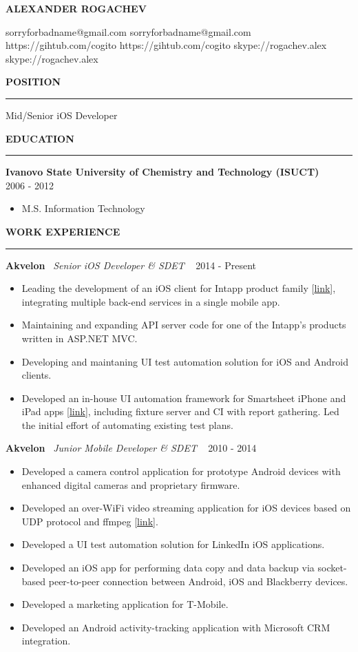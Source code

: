 ﻿\documentclass{article}
\newcommand*{\applicant}[1]{\gdef\applicanttext{#1}}
\newcommand*{\github}[1]{\gdef\githubtext{#1}}
\newcommand*{\email}[1]{\gdef\emailtext{#1}}
\newcommand*{\skype}[1]{\gdef\skypetext{#1}}
\renewcommand\maketitle{
  {\setstretch{1.2}
    \centerline{
       \textbf{\huge{\expandafter\MakeUppercase\expandafter{\applicanttext}}}
    }
    \begin{center}
      \ifdefined\emailtext
        \faEnvelopeO \hspace{0.1cm} \emailtext \hspace{0.1cm}
      \fi
      \ifdefined\githubtext
        \faGithub \hspace{0.1cm} \githubtext \hspace{0.1cm}
      \fi
      \ifdefined\skypetext
        \faSkype \hspace{0.1cm} \skypetext \hspace{0.1cm}

      \fi
      \ifdefined\linkedintext
        \faLinkedin \hspace{0.1cm} \linkedintext

      \fi
    \end{center}
  }
}
\newcommand{\cvsection}[1]{
  \vspace{2.6ex}
  \noindent\textbf{\large{\uppercase{#1}}}
  \vspace{1ex}
  \hrule
  \vspace{1.5ex}
}
\newcommand{\cvparagraph}[3]{
  \noindent\indent
  \textbf{#1}
  \ 
  \textit{#2}
  \ 
  \hfill{}
  {#3}\vspace{1ex}}
\newcommand{\cvlist}[1]{
  \begin{itemize}[topsep=0ex,leftmargin=*,itemsep=0ex,parsep=1ex,labelwidth=\parindent]
    #1
  \end{itemize}
}
\begin{document}
\pagestyle{fancy}
\fancyhf{}
\renewcommand{\headrulewidth}{0pt}
\cfoot{ \the\year\ --\ \LaTeX }

\applicant{Alexander Rogachev}
\github{https://gihtub.com/cogito}
\email{sorryforbadname@gmail.com}
\skype{skype://rogachev.alex}

\maketitle

\cvsection{Position}
Mid/Senior iOS Developer

\cvsection{Education}
\cvparagraph{Ivanovo State University of Chemistry and Technology (ISUCT)}{}{2006 - 2012}
\begin{itemize}[topsep=0ex,leftmargin=*]
  \item M.S. Information Technology
\end{itemize}

\cvsection{Work Experience}

\cvparagraph{Akvelon}{Senior iOS Developer \& SDET}{2014 - Present}
\cvlist{
  \item Leading the development of an iOS client for Intapp product family [\href{https://itunes.apple.com/us/app/intapp/id1052877767}{link}], integrating multiple back-end services in a single mobile app.
  \item Maintaining and expanding API server code for one of the Intapp's products written in ASP.NET MVC.
  \item Developing and maintaning UI test automation solution for iOS and Android clients.
  \item Developed an in-house UI automation framework for Smartsheet iPhone and iPad apps [\href{https://itunes.apple.com/us/app/smartsheet/id568421135}{link}], including fixture server and CI with report gathering. Led the initial effort of automating existing test plans.
}
\vspace{1ex}

\cvparagraph{Akvelon}{Junior Mobile Developer \& SDET}{2010 - 2014}
\cvlist{
  \item Developed a camera control application for prototype Android devices with enhanced digital cameras and proprietary firmware.
  \item Developed an over-WiFi video streaming application for iOS devices based on UDP protocol and ffmpeg [\href{http://neuronbeta.com/chirpglobal/chirpvision/app/}{link}].
  \item Developed a UI test automation solution for LinkedIn iOS applications.
  \item Developed an iOS app for performing data copy and data backup via socket-based peer-to-peer connection between Android, iOS and Blackberry devices.
  \item Developed a marketing application for T-Mobile.
  \item Developed an Android activity-tracking application with Microsoft CRM integration.
}
\end{document}
